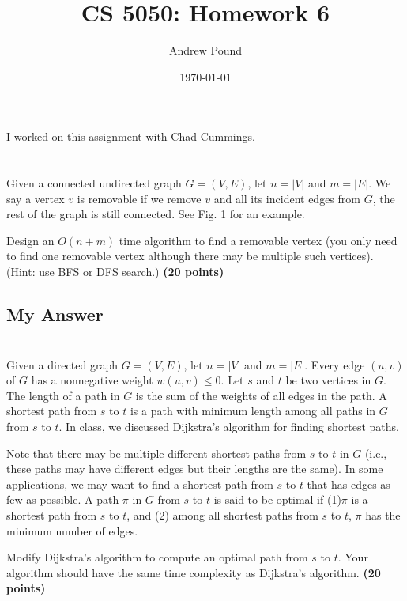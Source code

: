 \documentclass{article}
\title{CS 5050: Homework 6}
\author{Andrew Pound}
\date{\today}
\begin{document}
\maketitle

I worked on this assignment with Chad Cummings.
\section{}%
 Given a connected undirected graph $G = (V,E)$, let $n = |V |$ and $m
 = |E|$. We say a vertex $v$ is removable if we remove $v$ and all its
 incident edges from $G$, the rest of the graph is still connected. See Fig. 1 for an example.

Design an $O(n + m)$ time algorithm to find a removable vertex (you only need to find one
removable vertex although there may be multiple such vertices). (Hint: use BFS or DFS
search.) {\bf (20 points)}

\subsection{My Answer}



\section{}%

 Given a directed graph $G = (V,E)$, let $n = |V |$ and $m =
 |E|$. Every edge $(u,v)$ of $G$ has a nonnegative weight $w(u,v) \le
 0$. Let $s$ and $t$ be two vertices in $G$. The length of a path in
 $G$ is the sum of the weights of all edges in the path. A shortest
 path from $s$ to $t$ is a path with minimum length among all paths in
 $G$ from $s$ to $t$. In class, we discussed Dijkstra's algorithm for
 finding shortest paths. 

Note that there may be multiple different shortest paths from $s$ to
$t$ in $G$ (i.e., these paths may have different edges but their
lengths are the same). In some applications, we may want to find a
shortest path from $s$ to $t$ that has edges as few as possible. A
path $\pi$ in $G$ from $s$ to $t$ is said to be optimal if (1)$\pi$
is a shortest path from $s$ to $t$, and (2) among all shortest paths
from $s$ to $t$, $\pi$ has the minimum number of edges. 

Modify Dijkstra's algorithm to compute an optimal path from $s$ to
$t$. Your algorithm should have the same time complexity as Dijkstra's
algorithm. {\bf (20 points)}
\end{document}
